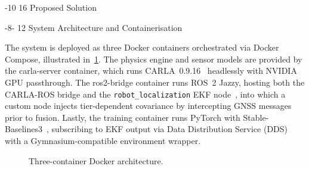 \documentclass{sig-alternate}
\makeatletter
\renewcommand\section{\@startsection{section}{1}{\z@}%
    {-10\p@ \@plus -4\p@ \@minus -2\p@}%
    {16\p@}%
    {\baselineskip 14pt\secfnt\@ucheadtrue}}
\renewcommand\subsection{\@startsection{subsection}{2}{\z@}%
    {-8\p@ \@plus -2\p@ \@minus -\p@}%
    {12\p@}%
    {\secfnt}}
\makeatother
\begin{document}

\section{Proposed Solution}
\label{sec:solution}

\subsection{System Architecture and Containerisation}

The system is deployed as three Docker containers orchestrated via Docker Compose, illustrated in~\cref{fig:architecture}. The physics engine and sensor models are provided by the carla-server container, which runs CARLA~0.9.16~\cite{dosovitskiy2017carla} headlessly with NVIDIA GPU passthrough. The ros2-bridge container runs ROS~2 Jazzy, hosting both the CARLA-ROS bridge and the \texttt{robot\_localization} EKF node~\cite{moore2014ekf}, into which a custom node injects tier-dependent covariance by intercepting GNSS messages prior to fusion. Lastly, the training container runs PyTorch with Stable-Baselines3~\cite{raffin2021sb3}, subscribing to EKF output via Data Distribution Service (DDS) with a Gymnasium-compatible environment wrapper.

\begin{figure}[htbp]
\centering
{}%
\caption{Three-container Docker architecture.\label{fig:architecture}}
\end{figure}
\end{document}
